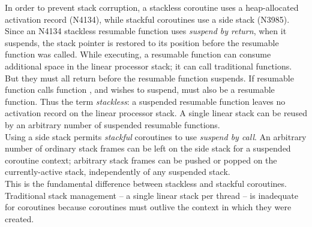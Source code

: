 In order to prevent stack corruption, a stackless coroutine uses a heap-allocated
activation record (N4134\cite{N4134}), while stackful coroutines use a side
stack (N3985\cite{N3985}).\\
Since an N4134 stackless resumable function uses \emph{suspend by return},
when it suspends, the stack pointer is restored to its position before the
resumable function was called. While executing, a resumable function can
consume additional space in the linear processor stack; it can call
traditional functions. But they must all return before the resumable function
suspends. If resumable function  calls function , and
 wishes to suspend,  must also be a resumable function. Thus
the term \emph{stackless}: a suspended resumable function leaves no activation
record on the linear processor stack. A single linear stack can be reused by
an arbitrary number of suspended resumable functions.\\
Using a side stack permits \emph{stackful} coroutines to use \emph{suspend by
call}. An arbitrary number of ordinary stack frames can be left on the side
stack for a suspended coroutine context; arbitrary stack frames can be pushed
or popped on the currently-active stack, independently of any suspended stack.\\
This is the fundamental difference between stackless and stackful coroutines.\\
\newline
Traditional stack management -- a single linear stack per thread -- is
inadequate for coroutines because coroutines must outlive the context in which
they were created.
